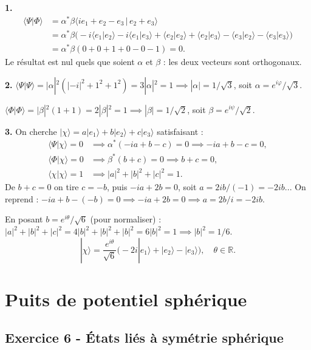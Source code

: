 \documentclass[12pt,a4paper]{article}
\begin{document}
\begin{boitecorrige}
\textbf{1.}
\begin{align*}
  \langle\Psi|\Phi\rangle
  &= \alpha^*\beta\langle ie_1+e_2-e_3\,|\,e_2+e_3\rangle\\
  &= \alpha^*\beta\bigl(-i\langle e_1|e_2\rangle - i\langle e_1|e_3\rangle
     + \langle e_2|e_2\rangle + \langle e_2|e_3\rangle
     - \langle e_3|e_2\rangle - \langle e_3|e_3\rangle\bigr)\\
  &= \alpha^*\beta(0 + 0 + 1 + 0 - 0 - 1) = 0.
\end{align*}
Le résultat est nul quels que soient $\alpha$ et $\beta$ : les deux vecteurs sont orthogonaux.

\textbf{2.}
$\langle\Psi|\Psi\rangle = |\alpha|^2(|-i|^2 + 1^2 + 1^2) = 3|\alpha|^2 = 1
\implies |\alpha| = 1/\sqrt{3}$, soit $\alpha = e^{i\varphi}/\sqrt{3}$.

$\langle\Phi|\Phi\rangle = |\beta|^2(1+1) = 2|\beta|^2 = 1
\implies |\beta| = 1/\sqrt{2}$, soit $\beta = e^{i\psi}/\sqrt{2}$.

\textbf{3.}
On cherche $|\chi\rangle = a|e_1\rangle + b|e_2\rangle + c|e_3\rangle$ satisfaisant :
\begin{align*}
  \langle\Psi|\chi\rangle = 0 &\implies \alpha^*(-ia + b - c) = 0 \implies -ia+b-c=0,\\
  \langle\Phi|\chi\rangle = 0 &\implies \beta^*(b+c) = 0 \implies b+c=0,\\
  \langle\chi|\chi\rangle = 1 &\implies |a|^2+|b|^2+|c|^2 = 1.
\end{align*}
De $b+c=0$ on tire $c=-b$, puis $-ia+2b=0$, soit $a=2ib/(-1) = -2ib$... On reprend :
$-ia+b-(-b)=0 \implies -ia+2b=0 \implies a = 2b/i = -2ib$.

En posant $b = e^{i\theta}/\sqrt{6}$ (pour normaliser) :
$|a|^2+|b|^2+|c|^2 = 4|b|^2+|b|^2+|b|^2 = 6|b|^2 = 1 \implies |b|^2 = 1/6$.
\[
  \boxed{|\chi\rangle = \frac{e^{i\theta}}{\sqrt{6}}\bigl(-2i|e_1\rangle + |e_2\rangle - |e_3\rangle\bigr),
         \quad \theta\in\mathbb{R}.}
\]
\end{boitecorrige}

\newpage
\section{Puits de potentiel sphérique}

\subsection*{Exercice 6 - États liés à symétrie sphérique \niveau{\difficile}}
\end{document}

